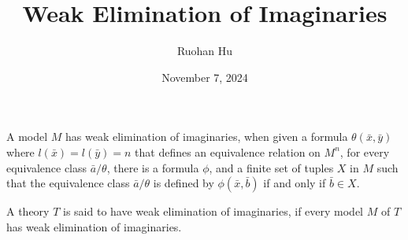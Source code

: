 \documentclass[a4paper]{article}
\title{Weak Elimination of Imaginaries}
\date{November 7, 2024}
\author{Ruohan Hu}
\begin{document}
\maketitle
\par{  
    A model \(M\) has weak elimination of imaginaries, when given a formula \(\theta ( \bar {x}, \bar {y})\) where \(l( \bar {x})=l( \bar {y})=n\) that defines an equivalence relation on \(M^n\), for every equivalence class \(\bar {a}/ \theta\), there is a formula \(\phi\), and a finite set of tuples \(X\) in \(M\) such that the equivalence class \(\bar {a}/ \theta\) is defined by \(\phi ( \bar {x}, \bar {b})\) if and only if \(\bar {b} \in  X\).
    
    A theory \(T\) is said to have weak elimination of imaginaries, if every model \(M\) of \(T\) has weak elimination of imaginaries.
}
\printbibliography
\end{document}
